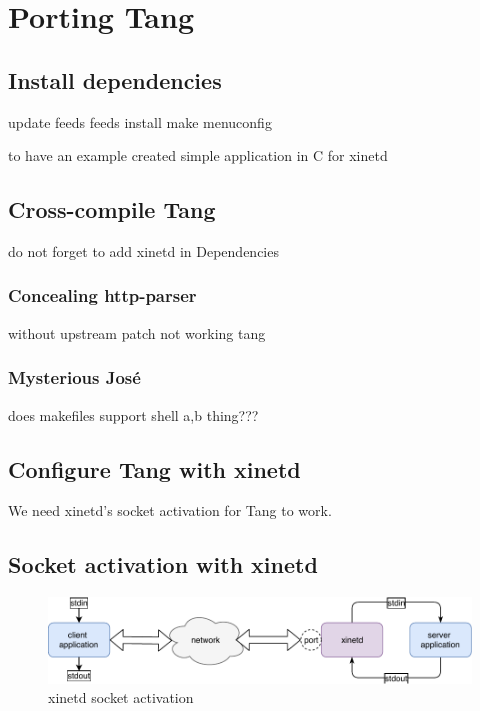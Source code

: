 \chapter{Porting Tang}\label{porting-tang}

\section{Install dependencies}

update feeds
feeds install
make menuconfig
\newpage



to have an example created simple application in C for xinetd
\newpage

\section{Cross-compile Tang}

do not forget to add xinetd in Dependencies
\newpage

\subsection{Concealing http-parser}

without upstream patch not working tang
\newpage

\subsection{Mysterious José}

does makefiles support shell {a,b} thing???
\newpage

\section{Configure Tang with xinetd}

We need xinetd's socket activation for Tang to work.
\section{Socket activation with xinetd}

\begin{figure}[h]
    \centering
    \includegraphics[scale=0.9]{figures/xinetd.pdf}
    \caption{xinetd socket activation}
    \label{fig_xinetd}
\end{figure}

